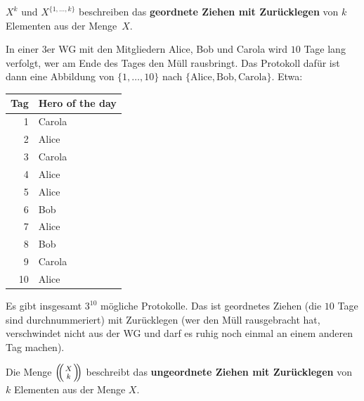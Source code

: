 \begin{bem}
	 $X^k$ und $X^{\{1,\ldots,k\}}$ beschreiben das \textbf{geordnete Ziehen mit Zurücklegen} von $k$ Elementen aus der Menge~$X$. 
\end{bem}

\begin{bsp} \label{wg:muell} 
In einer $3$er WG mit den Mitgliedern Alice, Bob und Carola wird $10$ Tage lang verfolgt, wer am Ende des Tages den Müll rausbringt. Das Protokoll dafür ist dann eine Abbildung von $\{1,\ldots,10\}$ nach $\{\text{Alice},\text{Bob},\text{Carola} \}$.  Etwa: 
\begin{center}
\begin{tabular}{r|l}
	Tag & Hero of the day
	\\  \hline 
	 1 & Carola
	\\ 2 & Alice
	\\ 3 & Carola
	\\ 4 & Alice
	\\ 5 & Alice
	\\ 6 & Bob
	\\ 7 & Alice
	\\ 8 & Bob
	\\ 9 & Carola
	\\ 10 & Alice
\end{tabular} 
\end{center} 

Es gibt insgesamt $3^{10}$ mögliche Protokolle. Das ist geordnetes Ziehen (die $10$  Tage sind durchnummeriert) mit Zurücklegen (wer den Müll rausgebracht hat, verschwindet  nicht aus der WG und darf es ruhig noch einmal an einem anderen Tag machen). 
\end{bsp} 

\begin{bem}
		 Die Menge $\multiset{X}{k}$ beschreibt das \textbf{ungeordnete Ziehen mit Zurücklegen} von $k$ Elementen aus der Menge $X$. 
\end{bem} 

